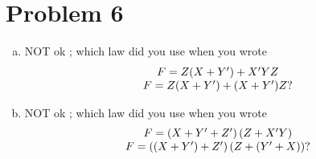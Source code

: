 \documentclass[10pt]{article} %
\begin{document}
\section*{Problem 6 }
\begin{enumerate}[(a)]
  \item NOT ok
    ; which law did you use when you wrote\begin{equation*}
      \begin{array}[]{c}
      F=Z(X+Y')+X'YZ\\
      F=Z(X+Y')+(X+Y')Z?
      \end{array}
    \end{equation*}
  \item NOT ok
    ; which law did you use when you wrote\begin{equation*}
      \begin{array}[]{c}
        F=\left( X+Y'+Z' \right)\left( Z+X'Y \right)\\
        F=\left( \left( X+Y' \right)+Z' \right)\left( Z+\left( Y'+X \right) \right)?
      \end{array}
    \end{equation*}
\end{enumerate}
\end{document}
